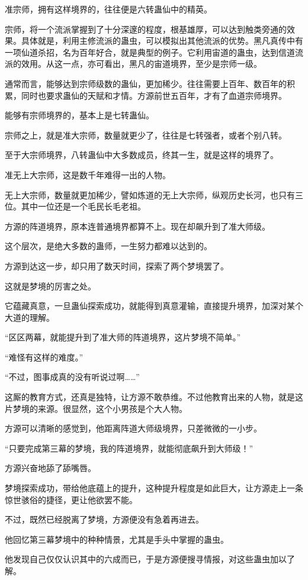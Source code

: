 \begin{this_body}
准宗师，拥有这样境界的，往往便是六转蛊仙中的精英。

宗师，将一个流派掌握到了十分深邃的程度，根基雄厚，可以达到触类旁通的效果。具体就是，利用主修流派的蛊虫，可以模拟出其他流派的优势。黑凡真传中有一项仙道杀招，名为百年好合，就是典型的例子。它利用宙道的蛊虫，达到信道流派的效用。从这一点，亦可看出，黑凡的宙道境界，至少是宗师一级。

通常而言，能够达到宗师级数的蛊仙，更加稀少。往往需要上百年、数百年的积累，同时也要求蛊仙的天赋和才情。方源前世五百年，才有了血道宗师境界。

能够有宗师境界的，基本上是七转蛊仙。

宗师之上，就是准大宗师，数量就更少了，往往是七转强者，或者个别八转。

至于大宗师境界，八转蛊仙中大多数成员，终其一生，就是这样的境界了。

准无上大宗师，这是数千年难得一出的人物。

无上大宗师，数量就更加稀少，譬如炼道的无上大宗师，纵观历史长河，也只有三位。其中一位还是一个毛民长毛老祖。

方源的阵道境界，原本连普通境界都算不上。现在却飙升到了准大师级。

这个层次，是绝大多数的蛊师，一生努力都难以达到的。

方源到达这一步，却只用了数天时间，探索了两个梦境罢了。

这就是梦境的厉害之处。

它蕴藏真意，一旦蛊仙探索成功，就能得到真意灌输，直接提升境界，加深对某个大道的理解。

“区区两幕，就能提升到了准大师的阵道境界，这片梦境不简单。”

“难怪有这样的难度。”

“不过，图事成真的没有听说过啊……”

这厮的教育方式，还真是独特，让方源不敢恭维。不过他教育出来的人物，就是这片梦境的来源。很显然，这个小男孩是个大人物。

方源可以清晰的感觉到，他距离阵道大师级境界，只差微微的一小步。

“只要完成第三幕的梦境，我的阵道境界，就能彻底飙升到大师级！”

方源兴奋地舔了舔嘴唇。

梦境探索成功，带给他底蕴上的提升，这种提升程度是如此巨大，让方源走上一条惊世骇俗的捷径，更让他欲罢不能。

不过，既然已经脱离了梦境，方源便没有急着再进去。

他回忆第三幕梦境中的种种情景，尤其是手头中掌握的蛊虫。

他发现自己仅仅认识其中的六成而已，于是方源便搜寻情报，对这些蛊虫加以了解。


\end{this_body}

